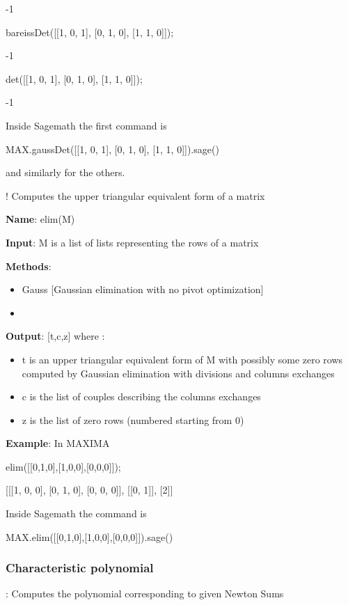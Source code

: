 \documentclass{article}
\begin{document}
-1

bareissDet([[1, 0, 1], [0, 1, 0], [1, 1, 0]]);

-1

det([[1, 0, 1], [0, 1, 0], [1, 1, 0]]);

-1

\noindent Inside Sagemath the first command is

MAX.gaussDet([[1, 0, 1], [0, 1, 0], [1, 1, 0]]).sage()

\noindent and similarly for the others.


!
  Computes the upper triangular equivalent form of a matrix
  
   {\bf Name}:   elim(M)
  
{\bf Input}: 
M is a list of lists representing the rows of a matrix

 {\bf Methods}:
  \begin{itemize}
    \item Gauss [Gaussian elimination with no pivot optimization]
    \item \color{grey}{Bareiss [Bareiss method]}
  \end{itemize}
  
{\bf Output}:   [t,c,z] where :
  \begin{itemize}
    \item t is an upper triangular equivalent form of M with possibly some
    zero rows computed by Gaussian elimination with divisions and columns
    exchanges
    \item c is the list of couples describing the columns exchanges
    \item z is the list of zero rows (numbered starting from 0)
  \end{itemize}
  
{\bf Example}: In MAXIMA

elim([[0,1,0],[1,0,0],[0,0,0]]);

[[[1, 0, 0], [0, 1, 0], [0, 0, 0]], [[0, 1]], [2]]

\noindent  Inside Sagemath the command is

MAX.elim([[0,1,0],[1,0,0],[0,0,0]]).sage()



\subsubsection{Characteristic polynomial}

:
  Computes the polynomial corresponding to given Newton Sums
  
\end{document}
